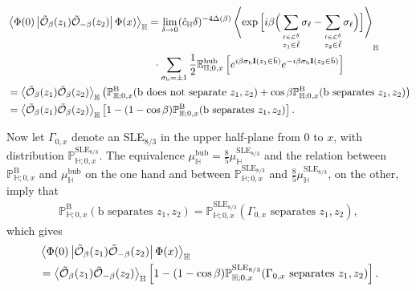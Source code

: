 \documentclass[a4paper,11pt]{article}
\begin{document}
\begin{align}
\begin{split} \label{eq:OO_bc-ops}
    & \Braket{\Phi(0) \left\vert \tilde{\mathcal{O}}_{\beta}(z_1) \tilde{\mathcal{O}}_{-\beta}(z_2) \right\vert \Phi(x)}_{\mathbb{H}} = \lim_{\delta \to 0} (\hat{c}_{\mathbb{H}}\delta)^{-4\Delta(\beta)} \Braket{\exp{\Big[i \beta \Big( \sum_{\stackrel{\ell \in \mathcal{L}^{\delta} }{z_1 \in \bar{\ell}}} \sigma_{\ell} - \sum_{\stackrel{\ell \in \mathcal{L}^{\delta} }{z_2 \in \bar{\ell}}} \sigma_{\ell} \Big) \Big]}}_{\mathbb{H}} \\
    & \qquad \qquad \qquad \qquad \qquad \qquad \qquad \cdot \sum_{\sigma_{\text{b}}=\pm 1} \frac{1}{2} \mathbb{E}^{\text{bub}}_{\mathbb{H};0,x} \left[ e^{i\beta\sigma_{\text{b}}\mathbf{I}(z_1 \in \bar{\text{b}})} e^{-i\beta\sigma_{\text{b}}\mathbf{I}(z_2 \in \bar{\text{b}})} \right] \\
    & = \Braket{\tilde{\mathcal{O}}_{\beta}(z_1) \tilde{\mathcal{O}}_{\beta}(z_2)}_{\mathbb{H}} \left( \mathbb{P}^{\text{B}}_{\mathbb{H};0,x}(\text{b does not separate } z_1,z_2)
    + \cos\beta \mathbb{P}^{\text{B}}_{\mathbb{H};0,x}(\text{b separates } z_1,z_2) \right) \\
    & = \Braket{\tilde{\mathcal{O}}_{\beta}(z_1) \tilde{\mathcal{O}}_{\beta}(z_2)}_{\mathbb{H}} \left[ 1 - (1-\cos\beta) \mathbb{P}^{\text{B}}_{\mathbb{H};0,x}(\text{b separates } z_1,z_2) \right].
\end{split}
\end{align}

Now let $\Gamma_{0,x}$ denote an SLE$_{8/3}$ in the upper half-plane from $0$ to $x$, with distribution $\mathbb{P}^{\text{SLE}_{8/3}}_{\mathbb{H};0,x}$. The equivalence $\mu^{\text{bub}}_{\mathbb{H}} = \frac{8}{5} \mu^{\text{SLE}_{8/3}}_{\mathbb{H}}$ and the relation between $\mathbb{P}^{\text{B}}_{\mathbb{H};0,x}$ and $\mu^{\text{bub}}_{\mathbb{H}}$ on the one hand and between $\mathbb{P}^{\text{SLE}_{8/3}}_{\mathbb{H};0,x}$ and $\frac{8}{5} \mu^{\text{SLE}_{8/3}}_{\mathbb{H}}$, on the other, imply that
\begin{align} \label{eq:equivalence-probabilities}
    \mathbb{P}^{\text{B}}_{\mathbb{H};0,x}(\text{b separates } z_1,z_2) = \mathbb{P}^{\text{SLE}_{8/3}}_{\mathbb{H};0,x}(\Gamma_{0,x} \text{ separates } z_1,z_2),
\end{align}
which gives
\begin{align}
\begin{split} \label{eq:OO_bc-ops_bis}
    & \Braket{\Phi(0) \left\vert \tilde{\mathcal{O}}_{\beta}(z_1) \tilde{\mathcal{O}}_{-\beta}(z_2) \right\vert \Phi(x)}_{\mathbb{H}} \\
    &= \Braket{\tilde{\mathcal{O}}_{\beta}(z_1) \tilde{\mathcal{O}}_{-\beta}(z_2)}_{\mathbb{H}} \left[ 1 - (1-\cos\beta) \mathbb{P}^{\text{SLE}_{8/3}}_{\mathbb{H};0,x}(\Gamma_{0,x} \text{ separates } z_1,z_2) \right].
\end{split}
\end{align}
\end{document}
